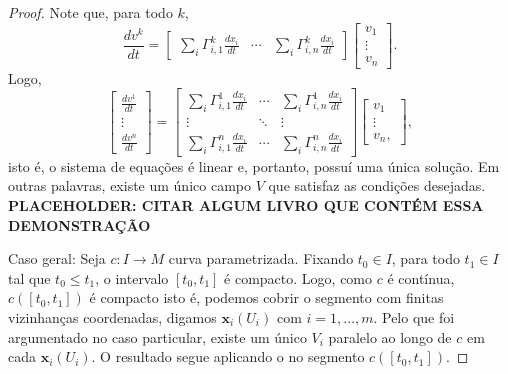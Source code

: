 \begin{proposition}
\begin{proof}
        Note que, para todo $k$,
        \begin{equation*}
            \frac{dv^{k}}{dt}=\begin{bmatrix}
                \sum_{i}\Gamma_{i,1}^{k}\frac{dx_{i}}{dt} & \cdots & \sum_{i}\Gamma_{i,n}^{k}\frac{dx_{i}}{dt}
            \end{bmatrix}\begin{bmatrix}
                v_{1} \\ \vdots \\ v_{n}
            \end{bmatrix}.
        \end{equation*}
        Logo,
        \begin{equation*}
            \begin{bmatrix}
                \frac{dv^{1}}{dt} \\ \vdots \\ \frac{dv^{n}}{dt}
            \end{bmatrix} = \begin{bmatrix}
                \sum_{i}\Gamma_{i,1}^{1}\frac{dx_{i}}{dt} & \cdots & \sum_{i}\Gamma_{i,n}^{1}\frac{dx_{i}}{dt} \\
                \vdots                                    & \ddots & \vdots                                    \\
                \sum_{i}\Gamma_{i,1}^{n}\frac{dx_{i}}{dt} & \cdots & \sum_{i}\Gamma_{i,n}^{n}\frac{dx_{i}}{dt}
            \end{bmatrix} \begin{bmatrix}
                v_{1}  \\
                \vdots \\
                v_{n},
            \end{bmatrix},
        \end{equation*}
        isto é, o sistema de equações é linear e, portanto, possuí uma única solução. Em outras palavras, existe um único campo $V$ que satisfaz as condições desejadas. \textbf{PLACEHOLDER: CITAR ALGUM LIVRO QUE CONTÉM ESSA DEMONSTRAÇÃO}

        Caso geral:
        Seja $c:I\to M$ curva parametrizada. Fixando $t_{0}\in I$, para todo $t_{1} \in I$ tal que $t_{0} \leq t_{1}$, o intervalo $[t_{0}, t_{1}]$ é compacto. Logo, como $c$ é contínua, $c([t_{0},t_{1}])$ é compacto isto é, podemos cobrir o segmento com finitas vizinhanças coordenadas, digamos $\mathbf{x}_{i}(U_{i})$ com $i=1, \dots, m$.
        Pelo que foi argumentado no caso particular, existe um único $V_{i}$ paralelo ao longo de $c$ em cada $\mathbf{x}_{i}(U_{i})$. O resultado segue aplicando o  no segmento $c([t_{0},t_{1}])$.
    \end{proof}
\end{proposition}
